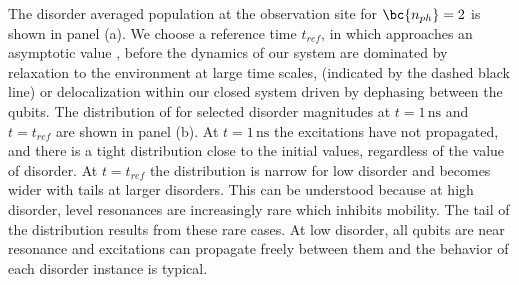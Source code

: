 The disorder averaged population at the observation site \bc{$\overline{\nqninet}$} for $\bc{n_{ph}}=2$ is shown in panel (a).
We choose a reference time $t_{ref}$, in which \bc{$\overline{ \nqninet }$} approaches an asymptotic value ,
before the dynamics of our system are dominated by relaxation to the environment at large time scales, (indicated by the dashed black line)
or delocalization within our closed system driven by dephasing between the qubits\autocite{supplement,Znidaric2015, Levi2016, Fischer2016, Luschen2017, vanNieuwenburg2017}.
The distribution of \bc{$\nqninet$} for selected disorder magnitudes at $t=1\,\text{ns}$ and $t=t_{ref}$ are shown in panel (b).
At $t=1\,\text{ns}$ the excitations have not propagated, and there is a tight distribution close to the initial values, regardless of the value of disorder.
At $t=t_{ref}$ the distribution is narrow for low disorder and becomes wider with tails at larger disorders.
This can be understood because at high disorder, level resonances are increasingly rare which inhibits mobility.
The tail of the distribution results from these rare cases.
At low disorder, all qubits are near resonance and excitations can propagate freely between them and the behavior of each disorder instance is typical.

